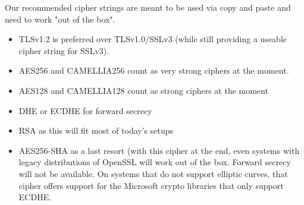 Our recommended cipher strings are meant to be used via copy and paste and need to work
"out of the box".

\begin{itemize}
\item TLSv1.2 is preferred over TLSv1.0/SSLv3 (while still providing a useable cipher
      string for SSLv3).
\item AES256 and CAMELLIA256 count as very strong ciphers at the moment.
\item AES128 and CAMELLIA128 count as strong ciphers at the moment
\item DHE or ECDHE for forward secrecy
\item RSA as this will fit most of today's setups
\item AES256-SHA as a last resort (with this cipher at the end, even systems with
      legacy distributions of OpenSSL will work out of the box. Forward secrecy
      will not be available. On systems that do not support elliptic curves, that cipher
      offers support for the Microsoft crypto libraries that only support ECDHE. 
\end{itemize}


